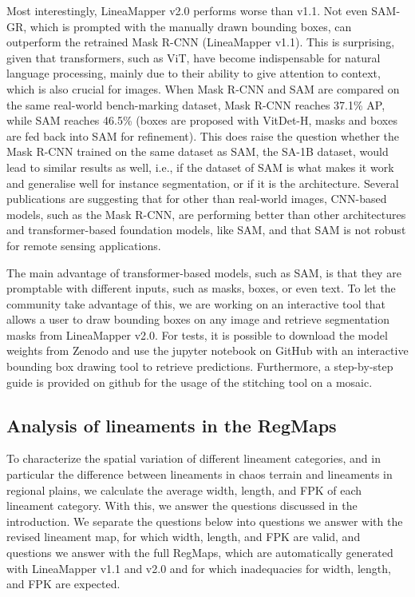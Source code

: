 Most interestingly, LineaMapper v2.0 performs worse than v1.1. Not even SAM-GR, which is prompted with the manually drawn bounding boxes, can outperform the retrained Mask R-CNN (LineaMapper v1.1). This is surprising, given that transformers, such as ViT, have become indispensable for natural language processing, mainly due to their ability to give attention to context, which is also crucial for images. When Mask R-CNN and SAM are compared on the same real-world bench-marking dataset, Mask R-CNN reaches 37.1\% AP, while SAM reaches 46.5\% (boxes are proposed with VitDet-H, masks and boxes are fed back into SAM for refinement).
This does raise the question whether the Mask R-CNN trained on the same dataset as SAM, the SA-1B dataset, would lead to similar results as well, i.e., if the dataset of SAM is what makes it work and generalise well for instance segmentation, or if it is the architecture. Several publications are suggesting that for other than real-world images, CNN-based models, such as the Mask R-CNN, are performing better than other architectures and transformer-based foundation models, like SAM, and that SAM is not robust for remote sensing applications.  

The main advantage of transformer-based models, such as SAM, is that they are promptable with different inputs, such as masks, boxes, or even text. To let the community take advantage of this, we are working on an interactive tool that allows a user to draw bounding boxes on any image and retrieve segmentation masks from LineaMapper v2.0. For tests, it is possible to download the model weights from Zenodo and use the jupyter notebook on GitHub with an interactive bounding box drawing tool to retrieve predictions. Furthermore, a step-by-step guide is provided on github for the usage of the stitching tool on a mosaic.



\subsection{Analysis of lineaments in the RegMaps}\label{sec:ALL_map_results}
To characterize the spatial variation of different lineament categories, and in particular the difference between lineaments in chaos terrain and lineaments in regional plains, we calculate the average width, length, and FPK of each lineament category. With this, we answer the questions discussed in the introduction. We separate the questions below into questions we answer with the revised lineament map, for which width, length, and FPK are valid, and questions we answer with the full RegMaps, which are automatically generated with LineaMapper v1.1 and v2.0 and for which inadequacies for width, length, and FPK are expected. 


